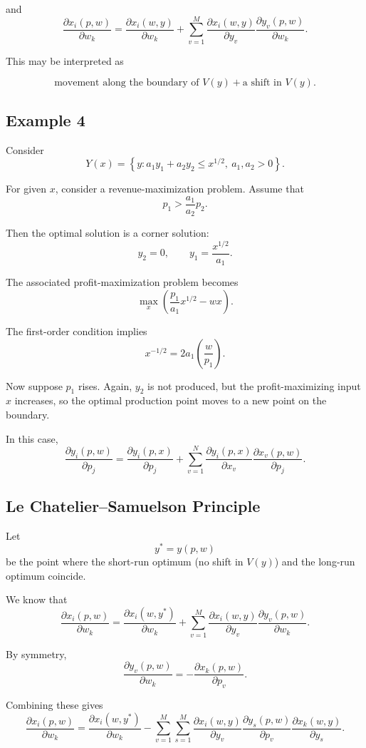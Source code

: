 and
\[
\frac{\partial x_i(p,w)}{\partial w_k}
=
\frac{\partial x_i(w,y)}{\partial w_k}
+
\sum_{v=1}^M
\frac{\partial x_i(w,y)}{\partial y_v}
\frac{\partial y_v(p,w)}{\partial w_k}.
\]

This may be interpreted as

\[
\text{movement along the boundary of } V(y)
+
\text{a shift in } V(y).
\]

\subsection*{Example 4}

Consider
\[
Y(x)=\left\{y : a_1 y_1 + a_2 y_2 \le x^{1/2},\ a_1,a_2>0\right\}.
\]

For given $x$, consider a revenue-maximization problem.
Assume that
\[
p_1 > \frac{a_1}{a_2} p_2.
\]

Then the optimal solution is a corner solution:
\[
y_2 = 0,
\qquad
y_1 = \frac{x^{1/2}}{a_1}.
\]

The associated profit-maximization problem becomes
\[
\max_x \left( \frac{p_1}{a_1} x^{1/2} - wx \right).
\]

The first-order condition implies
\[
x^{-1/2} = 2a_1 \left(\frac{w}{p_1}\right).
\]

Now suppose $p_1$ rises. Again, $y_2$ is not produced, but the
profit-maximizing input $x$ increases, so the optimal production point
moves to a new point on the boundary.

In this case,
\[
\frac{\partial y_i(p,w)}{\partial p_j}
=
\frac{\partial y_i(p,x)}{\partial p_j}
+
\sum_{v=1}^N
\frac{\partial y_i(p,x)}{\partial x_v}
\frac{\partial x_v(p,w)}{\partial p_j}.
\]

\subsection*{Le Chatelier--Samuelson Principle}

Let
\[
y^* = y(p,w)
\]
be the point where the short-run optimum
(no shift in $V(y)$) and the long-run optimum coincide.

We know that
\[
\frac{\partial x_i(p,w)}{\partial w_k}
=
\frac{\partial x_i(w,y^*)}{\partial w_k}
+
\sum_{v=1}^M
\frac{\partial x_i(w,y)}{\partial y_v}
\frac{\partial y_v(p,w)}{\partial w_k}.
\]

By symmetry,
\[
\frac{\partial y_v(p,w)}{\partial w_k}
=
-
\frac{\partial x_k(p,w)}{\partial p_v}.
\]

Combining these gives
\[
\frac{\partial x_i(p,w)}{\partial w_k}
=
\frac{\partial x_i(w,y^*)}{\partial w_k}
-
\sum_{v=1}^M \sum_{s=1}^M
\frac{\partial x_i(w,y)}{\partial y_v}
\frac{\partial y_s(p,w)}{\partial p_v}
\frac{\partial x_k(w,y)}{\partial y_s}.
\]

